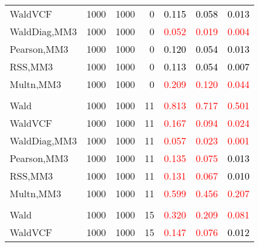 \documentclass[
]{article}
\begin{document}
\begin{table}[H]
{\begin{tabular}[t]{lrrrrrr}
\hspace{1em}WaldVCF & 1000 & 1000 & 0 & \textcolor{black}{0.115} & \textcolor{black}{0.058} & \textcolor{black}{0.013}\\
\hspace{1em}WaldDiag,MM3 & 1000 & 1000 & 0 & \textcolor{red}{0.052} & \textcolor{red}{0.019} & \textcolor{red}{0.004}\\
\hspace{1em}Pearson,MM3 & 1000 & 1000 & 0 & \textcolor{black}{0.120} & \textcolor{black}{0.054} & \textcolor{black}{0.013}\\
\hspace{1em}RSS,MM3 & 1000 & 1000 & 0 & \textcolor{black}{0.113} & \textcolor{black}{0.054} & \textcolor{black}{0.007}\\
\hspace{1em}Multn,MM3 & 1000 & 1000 & 0 & \textcolor{red}{0.209} & \textcolor{red}{0.120} & \textcolor{red}{0.044}\\
\addlinespace[0.3em]
\multicolumn{7}{l}{\textbf{1F 15V}}\\
\hspace{1em}Wald & 1000 & 1000 & 11 & \textcolor{red}{0.813} & \textcolor{red}{0.717} & \textcolor{red}{0.501}\\
\hspace{1em}WaldVCF & 1000 & 1000 & 11 & \textcolor{red}{0.167} & \textcolor{red}{0.094} & \textcolor{red}{0.024}\\
\hspace{1em}WaldDiag,MM3 & 1000 & 1000 & 11 & \textcolor{red}{0.057} & \textcolor{red}{0.023} & \textcolor{red}{0.001}\\
\hspace{1em}Pearson,MM3 & 1000 & 1000 & 11 & \textcolor{red}{0.135} & \textcolor{red}{0.075} & \textcolor{black}{0.013}\\
\hspace{1em}RSS,MM3 & 1000 & 1000 & 11 & \textcolor{red}{0.131} & \textcolor{red}{0.067} & \textcolor{black}{0.010}\\
\hspace{1em}Multn,MM3 & 1000 & 1000 & 11 & \textcolor{red}{0.599} & \textcolor{red}{0.456} & \textcolor{red}{0.207}\\
\addlinespace[0.3em]
\multicolumn{7}{l}{\textbf{2F 10V}}\\
\hspace{1em}Wald & 1000 & 1000 & 15 & \textcolor{red}{0.320} & \textcolor{red}{0.209} & \textcolor{red}{0.081}\\
\hspace{1em}WaldVCF & 1000 & 1000 & 15 & \textcolor{red}{0.147} & \textcolor{red}{0.076} & \textcolor{black}{0.012}\\

\end{tabular}}
\end{table}
\end{document}
